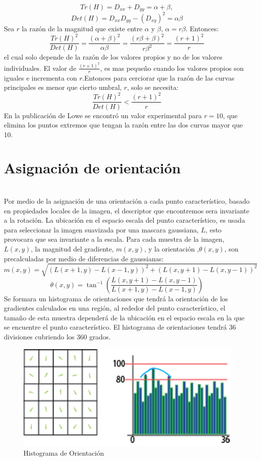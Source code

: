 		$$Tr(H) = D_{xx} + D_{yy} = \alpha+\beta,$$ $$Det(H) = D_{xx}D_{yy}-(D_{xy})^2= \alpha\beta$$
		Sea $r$ la razón de la magnitud que existe entre $\alpha$ y $\beta$, $\alpha = r\beta$. Entonces:
		$$\frac{Tr(H)^2}{Det(H)}= \frac{(\alpha+\beta)^2}{\alpha\beta}= \frac{(r\beta+\beta)^2}{r\beta^2}= \frac{(r+1)^2}{r}$$
		el cual solo depende de la razón de los valores propios y no de los valores individuales. El valor de $\frac{(r+1)^2}{r}$, es mas pequeño cuando los valores propios son iguales e incrementa con $r$.Entonces para cerciorar que la razón de las curvas principales es menor que cierto umbral, $r$, solo se necesita:
		$$\frac{Tr(H)^2}{Det(H)} < \frac{(r+1)^2}{r}$$
		En la publicación de Lowe \cite{Lowe2004} se encontró un valor experimental para $r=10$, que elimina los puntos extremos que tengan la razón entre las dos curvas mayor que 10.
	
	
	\section{Asignación de orientación} \hfill \\
		Por medio de la asignación de una orientación a cada punto característico, basado en propiedades locales de la imagen, el descriptor que encontremos sera invariante a la rotación. La ubicación en el espacio escala del punto característico, es usada para seleccionar la imagen suavizada por una mascara gaussiana, $L$, esto provocara que sea invariante a la escala. Para cada muestra de la imagen, $L(x,y)$, la magnitud del gradiente, $m(x,y)$, y la orientación ,$\theta(x,y)$, son precalculadas por medio de diferencias de gaussianas:
  		$$m(x,y) = \sqrt{ (L(x+1,y)-L(x-1,y))^2 + (L(x,y+1)-L(x,y-1))^2 }$$		
		$$\theta(x,y) =  \tan^{-1} \left(\frac{L(x,y+1)-L(x,y-1)}{L(x+1,y)-L(x-1,y)}\right)$$
		Se formara un histograma de orientaciones que tendrá la orientación de los gradientes calculados en una región, al rededor del punto característico, el tamaño de esta muestra dependerá de la ubicación en el espacio escala en la que se encuentre el punto característico. El histograma de orientaciones tendrá 36 divisiones cubriendo los 360 grados.
		
		
		\begin{figure}[h]
			\centering
				\includegraphics[scale=0.7]{img/HistoOrientacion.png}
			\caption{Histograma de Orientación }
	\end{figure}
		
